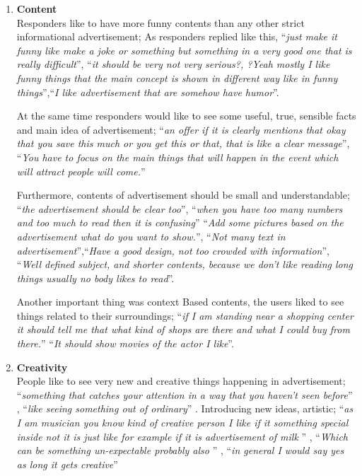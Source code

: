 \begin{enumerate}
\item \textbf{Content} \\
Responders like to have more funny contents than any other strict informational advertisement; As responders replied like this, ``\emph{just make it funny like make a joke or something but something in a very good one that is really difficult}'', ``\emph{it should be very not very serious?, ?Yeah mostly I like funny things that the main concept is shown in different way like in funny things}'',``\emph{I like advertisement that are somehow have humor}''.

At the same time responders would like to see some useful, true, sensible facts and main idea of advertisement; ``\emph{an offer if it is clearly mentions that okay that you save this much or you get this or that, that is like a clear message}'',  ``\emph{You have to focus on the main things that will happen in the event which will attract people will come.}'' 

Furthermore, contents of advertisement should be small and understandable; ``\emph{the advertisement should be clear too}'', ``\emph{when you have too many numbers and too much to read then it is confusing}'' ``\emph{Add some pictures based on the advertisement what do you want to show.}'', ``\emph{Not many text in advertisement}'',``\emph{Have a good design, not too crowded with information}'', ``\emph{Well defined subject, and shorter contents, because we don't like reading long things usually no  body likes to read}''. 

Another important thing was context Based contents, the users liked to see things related to their surroundings; ``\emph{if I am standing near a shopping center it should tell me that what kind of shops are there and what I could buy from there.}'' ``\emph{It should show movies of the actor I like}''. 
		
		
\item \textbf{Creativity} \\	
People like to see very new and creative things happening in advertisement; ``\emph{something that catches your attention in a way that you haven't seen before}'' , ``\emph{like seeing something out of ordinary}'' . Introducing new ideas, artistic; ``\emph{as I am musician you know kind of creative person I like if it something special inside not it is just like for example if it is advertisement of milk }'' , ``\emph{Which can be something un-expectable probably also }'' , ``\emph{in general I would say yes as long it gets creative}'' 


\end{enumerate}
